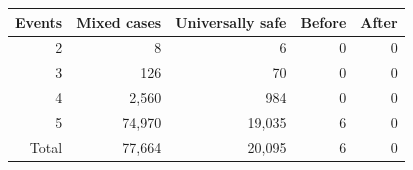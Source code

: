 \begin{tabular}{rrrrr}
\toprule
Events & Mixed cases & Universally safe & Before & After\\
\midrule
2 & 8 & 6 & 0 & 0\\
3 & 126 & 70 & 0 & 0\\
4 & 2,560 & 984 & 0 & 0\\
5 & 74,970 & 19,035 & 6 & 0\\
\midrule
Total & 77,664 & 20,095 & 6 & 0\\
\bottomrule
\end{tabular}
